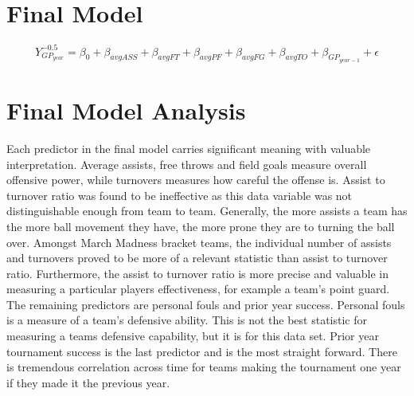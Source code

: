 \documentclass[]{scrartcl}
\begin{document}
\section*{Final Model}
	\[
Y_{GP_{year}}^{-0.5} = \beta_0 + \beta_{avgASS} +\beta_{avgFT} + \beta_{avgPF} + \beta_{avgFG} + \beta_{avgTO} + \beta_{GP_{year-1}}+ \epsilon 
\]
\section*{Final Model Analysis}
Each predictor in the final model carries significant meaning with valuable interpretation. Average assists, free throws and field goals measure overall offensive power, while turnovers measures how careful the offense is. Assist to turnover ratio was found to be ineffective as this data variable was not distinguishable enough from team to team. Generally, the more assists a team has the more ball movement they have, the more prone they are to turning the ball over. Amongst March Madness bracket teams, the individual number of assists and turnovers proved to be more of a relevant statistic than assist to turnover ratio. Furthermore, the assist to turnover ratio is more precise and valuable in measuring a particular players effectiveness, for example a team's point guard. The remaining predictors are personal fouls and prior year success. Personal fouls is a measure of a team's defensive ability. This is not the best statistic for measuring a teams defensive capability, but it is for this data set. Prior year tournament success is the last predictor and is the most straight forward. There is tremendous correlation across time for teams making the tournament one year if they made it the previous year.
\end{document}
